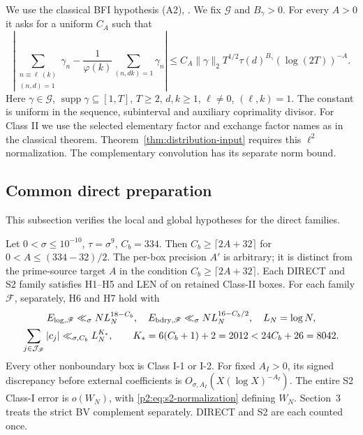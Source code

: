 We use the classical BFI hypothesis (A2), \cite{ref2}.
We fix $\mathscr G$ and $B_\gamma>0$.
For every $A>0$ it asks for a uniform $C_A$ such that
\[
 \left|\sum_{\substack{n\equiv\ell\ (k)\\(n,d)=1}}\gamma_n
 -\frac1{\varphi(k)}\sum_{(n,dk)=1}\gamma_n\right|
 \le C_A\|\gamma\|_2T^{1/2}\tau(d)^{B_\gamma}(\log(2T))^{-A}.
\]
Here $\gamma\in\mathscr G$, $\operatorname{supp}\gamma\subseteq[1,T]$, $T\ge2$,
$d,k\ge1$, $\ell\ne0$, $(\ell,k)=1$.
The constant is uniform in the sequence, subinterval and auxiliary coprimality divisor.
For Class II we use the selected elementary factor
and exchange factor names as in the classical theorem.
Theorem~\ref{thm:distribution-input} requires this $\ell^2$ normalization.
The complementary convolution has its separate norm bound.


\subsection{Common direct preparation}
This subsection verifies the local and global hypotheses for the direct families.
\begin{lemma}
\label{lem:s2-preparation}\label{lem:direct-preparation}
Let $0<\sigma\le10^{-10}$, $\tau=\sigma^9$, $C_b=334$.
Then $C_b\ge\lceil2A+32\rceil$ for $0<A\le(334-32)/2$.
The per-box precision $A'$ is arbitrary; it is distinct from the
prime-source target $A$ in the condition $C_b\ge\lceil2A+32\rceil$.
Each DIRECT and S2 family satisfies H1--H5 and LEN of
\cite[Theorem~3.2]{Z1} on retained Class-II boxes.
For each family $\mathscr F$, separately, H6 and H7 hold with
\[
\begin{gathered}
 E_{\rm log,\mathscr F}\ll_\sigma NL_N^{18-C_b},\quad
 E_{\rm bdry,\mathscr F}\ll_\sigma NL_N^{16-C_b/2},\quad L_N=\log N,\\
 \sum_{j\in\mathcal J_{\mathscr F}}|c_j|\ll_{\sigma,C_b}L_N^{K_*},\qquad
 K_*=6(C_b+1)+2=2012<24C_b+26=8042.
\end{gathered}
\]
Every other nonboundary box is Class I-1 or I-2.
For fixed $A_I>0$, its signed discrepancy before external coefficients is
$O_{\sigma,A_I}(X(\log X)^{-A_I})$.
The entire S2 Class-I error is $o(W_N)$, with
\eqref{p2:eq:s2-normalization} defining $W_N$.
Section~3 treats the strict BV complement separately.
DIRECT and S2 are each counted once.
\end{lemma}
